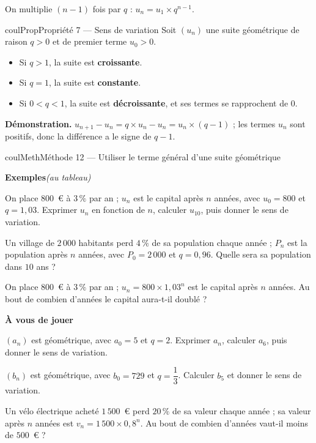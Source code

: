 \documentclass[11pt,a4paper]{article}
\makeatletter
\newcounter{lycee@signet}
\newcommand{\signet}[3][]{\stepcounter{lycee@signet}%
  \edef\lycee@dest{\if\relax\detokenize{#1}\relax
    signet.\arabic{lycee@signet}\else#1\fi}%
  \hypertarget{\lycee@dest}{}\bookmark[level=#2,dest=\lycee@dest]{#3}}
\newcounter{methode}
\newenvironment{proprietebox}[1][Propriété]%
  {\begin{boitecours}[phantom={\signet{2}{#1}}]{coulProp}{#1}}{\end{boitecours}}
\newenvironment{methodebox}[1][Méthode]{\stepcounter{methode}%
  \begin{boitecours}[phantom={\signet[methode-\arabic{methode}]{2}{#1}}]{coulMeth}{#1}}%
  {\end{boitecours}}
\newcommand{\etape}[1]{\par\smallskip\textbf{\color{coulMeth}#1}\par\nobreak\smallskip}
\newcommand{\demo}[1]{\textbf{\color{coulMeth}Démonstration.} #1}
\newcommand{\autableau}{\hfill{\footnotesize\itshape\color{black!45}(au tableau)}}
\newcommand{\etapeexemples}{%
    \par\smallskip\textbf{\color{coulMeth}Exemples}\autableau\par\nobreak\smallskip}
\makeatother
\begin{document}
\begin{remarquebox}
On multiplie $(n-1)$ fois par $q$ : $u_{n}=u_{1}\times q^{n-1}$.
\end{remarquebox}

\begin{proprietebox}[Propriété 7 --- Sens de variation]
Soit $(u_{n})$ une suite géométrique de raison $q>0$ et de premier terme $u_{0}>0$.
\begin{itemize}
  \item Si $q>1$, la suite est \textbf{croissante}.
  \item Si $q=1$, la suite est \textbf{constante}.
  \item Si $0<q<1$, la suite est \textbf{décroissante}, et ses termes se rapprochent de
        $0$.
\end{itemize}
\end{proprietebox}

\demo{$u_{n+1}-u_{n}=q\times u_{n}-u_{n}=u_{n}\times(q-1)$ ; les termes $u_{n}$ sont
positifs, donc la différence a le signe de $q-1$.}

\begin{methodebox}[Méthode 12 --- Utiliser le terme général d'une suite géométrique]
\etapeexemples
\begin{questions}[label=\alph*)]
  \item On place $800$~€ à $3\,\%$ par an ; $u_{n}$ est le capital après $n$ années,
        avec $u_{0}=800$ et $q=1{,}03$. Exprimer $u_{n}$ en fonction de $n$, calculer
        $u_{10}$, puis donner le sens de variation.
  \item Un village de $2\,000$ habitants perd $4\,\%$ de sa population chaque année ;
        $P_{n}$ est la population après $n$ années, avec $P_{0}=2\,000$ et $q=0{,}96$.
        Quelle sera sa population dans $10$ ans ?
  \item On place $800$~€ à $3\,\%$ par an ; $u_{n}=800\times 1{,}03^{n}$ est le capital
        après $n$ années. Au bout de combien d'années le capital aura-t-il doublé ?
\end{questions}

\etape{À vous de jouer}
\begin{questions}[label=\alph*)]
  \item $(a_{n})$ est géométrique, avec $a_{0}=5$ et $q=2$. Exprimer $a_{n}$, calculer
        $a_{6}$, puis donner le sens de variation.
  \item $(b_{n})$ est géométrique, avec $b_{0}=729$ et $q=\dfrac{1}{3}$. Calculer $b_{5}$
        et donner le sens de variation.
  \item Un vélo électrique acheté $1\,500$~€ perd $20\,\%$ de sa valeur chaque année ;
        sa valeur après $n$ années est $v_{n}=1\,500\times 0{,}8^{n}$. Au bout de
        combien d'années vaut-il moins de $500$~€ ?
\end{questions}

\end{methodebox}
\end{document}
